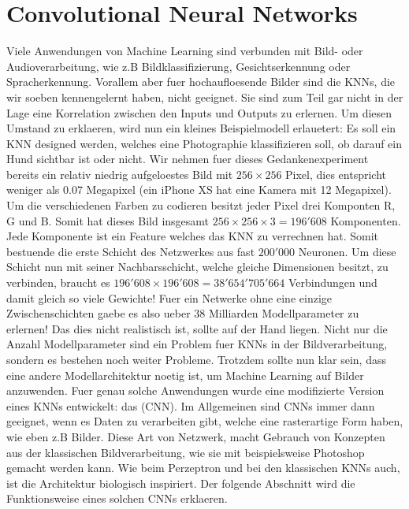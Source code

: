 \chapter{Convolutional Neural Networks}
Viele Anwendungen von Machine Learning sind verbunden mit Bild- oder
Audioverarbeitung, wie z.B Bildklassifizierung, Gesichtserkennung oder
Spracherkennung.
Vorallem aber fuer hochaufloesende Bilder sind die KNNs, die wir soeben
kennengelernt haben, nicht geeignet. Sie sind zum Teil gar nicht in der
Lage eine Korrelation zwischen den Inputs und Outputs zu erlernen.
Um diesen Umstand zu erklaeren, wird nun ein kleines Beispielmodell erlauetert:
\para{}
\label{sec:CNN_parameter_problem}
Es soll ein KNN designed werden, welches eine Photographie klassifizieren
soll, ob darauf ein Hund sichtbar ist oder nicht. Wir nehmen fuer dieses
Gedankenexperiment bereits ein relativ niedrig aufgeloestes Bild mit $256 \times 256$
Pixel, dies entspricht weniger als $0.07$ Megapixel (ein iPhone XS hat eine Kamera mit
12 Megapixel). Um die verschiedenen Farben zu codieren besitzt jeder Pixel drei Komponten R, G
und B. Somit hat dieses Bild insgesamt $256 \times 256 \times 3 = 196'608$
Komponenten. Jede Komponente ist ein Feature welches das KNN zu verrechnen hat. Somit bestuende
die erste Schicht des Netzwerkes aus fast $200'000$ Neuronen. Um diese Schicht
nun mit seiner Nachbarsschicht, welche gleiche Dimensionen besitzt, zu verbinden, braucht
es $196'608 \times 196'608 = 38'654'705'664$ Verbindungen und damit gleich so
viele Gewichte! Fuer ein Netwerke ohne eine einzige Zwischenschichten gaebe es
also ueber 38 Milliarden Modellparameter zu erlernen! Das dies nicht realistisch ist,
sollte auf der Hand liegen.
\para{}
Nicht nur die Anzahl Modellparameter sind ein Problem fuer KNNs in der
Bildverarbeitung, sondern es bestehen noch weiter Probleme.
Trotzdem sollte nun klar sein, dass eine andere Modellarchitektur noetig ist, um Machine
Learning auf Bilder anzuwenden. Fuer genau solche Anwendungen wurde eine modifizierte
Version eines KNNs entwickelt: das  (CNN).
Im Allgemeinen sind CNNs immer dann geeignet, wenn es Daten zu verarbeiten gibt, welche eine
rasterartige Form haben, wie eben z.B Bilder.
Diese Art von Netzwerk, macht Gebrauch von Konzepten aus der klassischen
Bildverarbeitung, wie sie mit beispielsweise Photoshop gemacht werden kann.
Wie beim Perzeptron und bei den klassischen KNNs auch, ist die Architektur
biologisch inspiriert.
Der folgende Abschnitt wird die Funktionsweise eines solchen CNNs erklaeren.
\para{}
\cite{Goodfellow-et-al-2016}
\cite{deeplearning.ai:cnn}
\cite{wiki:cnn}


